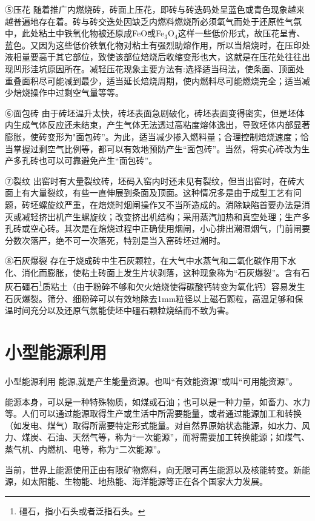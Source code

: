 \documentclass{ctexbook}
\begin{document}
⑤压花 随着推广内燃烧砖，砖面上压花，即砖与砖迭码处呈蓝色或青色现象越来越普遍地存在着。砖与砖交迭处因缺乏内燃料燃烧所必须氧气而处于还原性气氛中，此处粘土中铁氧化物被还原成FeO或Fe$_3$O$_4$这样一些低价形式，故压花呈青、蓝色。又因为这些低价铁氧化物对粘土有强烈助熔作用，所以当焙烧时，在压印处液相量要高于其它部位，致使该部位焙烧后收缩变形也大，这就是在压花处往往出现凹形洼坑原因所在。减轻压花现象主要方法有:选择适当码法，使条面、顶面处重叠面积尽可能减到最少，适当延长焙烧周期，使内燃料尽可能燃烧完全；适当减少焙烧操作中过剩空气量等等。

⑥面包砖 由于砖坯温升太快，砖坯表面急剧破化，砖坯表面变得密实，但是坯体内生成气体反应还未结束，产生气体无法透过高粘度熔体逸出，导致坯体内部显著膨胀，使砖变形为"面包砖”。为此，适当减少掺入燃料量；合理控制焙烧速度；恰当掌握过剩空气比例等，都可以有效地预防产生“面包砖”。当然，将实心砖改为生产多孔砖也可以可靠避免产生“面包砖”。

⑦裂纹 出窑时有大量裂纹砖，坯码入窑内时还未见有裂纹，但当出窑时，在砖大面上有大量裂纹，有些一直伸展到条面及顶面。这种情况多是由于成型工艺有问题，砖坯螺旋纹严重，在焙烧时烟闸操作又不当所造成的。消除缺陷首要办法是消灭或减轻挤出机产生螺旋纹；改变挤出机结构；采用蒸汽加热和真空处理；生产多孔砖或空心砖。其次是在焙烧过程中正确使用烟闸，小心排出潮湿烟气，门前闸要分数次落严，绝不可一次落死，特别是当入窑砖坯过潮时。

⑧石灰爆裂 存在于烧成砖中生石灰颗粒，在大气中水蒸气和二氧化碳作用下水化、消化而膨胀，使粘土砖面上发生片状剥落，这种现象称为“石灰爆裂”。含有石灰石礓石\footnote{礓石，指小石头或者泛指石头。}质粘土（由于粉碎不够和欠火焙烧使得碳酸钙转变为氧化钙）容易发生石灰爆裂。筛分、细粉碎可以有效地除去1mm粒径以上磁石颗粒，高温足够和保温时间充分以及还原气氛能使坯中礓石颗粒烧结而不致为害。






      
\chapter{小型能源利用}
小型能源利用
能源,就是产生能量资源。也叫“有效能资源”或叫“可用能资源”。

能源本身，可以是一种特殊物质，如煤或石油；也可以是一种力量，如畜力、水力等。人们可以通过能源取得生产或生活中所需要能量，或者通过能源加工和转换（如发电、煤气）取得所需要特定形式能量。对自然界原始状态能源，如水力、风力、煤炭、石油、天然气等，称为“一次能源”，而将需要加工转换能源；如煤气、蒸气机、内燃机、电等，称为“二次能源”。

当前，世界上能源使用正由有限矿物燃料，向无限可再生能源以及核能转变。新能源，如太阳能、生物能、地热能、海洋能源等正在各个国家大力发展。
\end{document}
